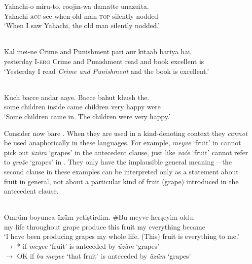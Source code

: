 \documentclass[output=paper,
modfonts
]{langscibook}
\begin{document}
	\ex \label{ex:despic:9b}
	\gll 
	{Yahachi-o} {miru-to}, {roojin-wa} {damatte} {unazuita}. \\
	Yahachi-\textsc{acc} see-when {old man-\textsc{top}} silently nodded \\ 
	\glt `When I saw Yahachi, the old man silently nodded.' \citep[14]{Fujisawa1992}
	\z
	\z 
	
	\ea \label{ex:despic:10}
	 \\ 
	\gll 
	{Kal} {mei-ne} {Crime and Punishment} {pari} {aur} {kitaab} {bariya} {hai.} \\
	yesterday I-\textsc{erg} {Crime and Punishment} read and book excellent is \\ 
	\glt `Yesterday I read \textit{Crime and Punishment} and the book is excellent.'
	\z
	
	\ea \label{ex:despic:11}
	 \\
	\gll
	{Kuch} {bacce} {andar} {aaye}. {Bacce} {bahut} {khush} {the.} \\
	some children inside came children very happy were \\ 
	\glt `Some children came in. The children were very happy.' \citep[403]{Dayal2004}
	\z 
	
	Consider now bare . When they are used in a kind-denoting context they \textit{cannot} be
	used anaphorically in these languages. For example, \textit{meyve} `fruit' in  cannot pick out \textit{\"uz\"um} `grapes' in the antecedent clause, just like \textit{vo\'ce} `fruit' cannot refer to \textit{gro\v z\dj e} `grapes' in . They only have the implausible general meaning -- the second clause in these examples can be interpreted only as a statement about fruit in general, not about a particular kind of fruit (grape) introduced in the antecedent clause. 
	
	
	\ea \label{ex:despic:12}
	 \\
	\gll 
	{\"Omr\"um} {boyunca} {\"uz\"um} {yeti\c stirdim}. {\textnormal{\#}{\op}Bu{\cp}} {meyve} {her\c seyim} {oldu}. \\
	{my life} throughout grape produce \phantom{(\#}this fruit {my everything} became \\ 
	\glt `I have been producing grapes my whole life. (This) fruit is everything to me.' \\ 
	$\rightarrow$ * if \textit{meyve} `fruit' is anteceded by \textit{\"uz\"um} `grapes' \\
	$\rightarrow$ OK if \textit{bu meyve} `that fruit' is anteceded by \textit{\"uz\"um} `grapes'
	\z 
	
\end{document}

